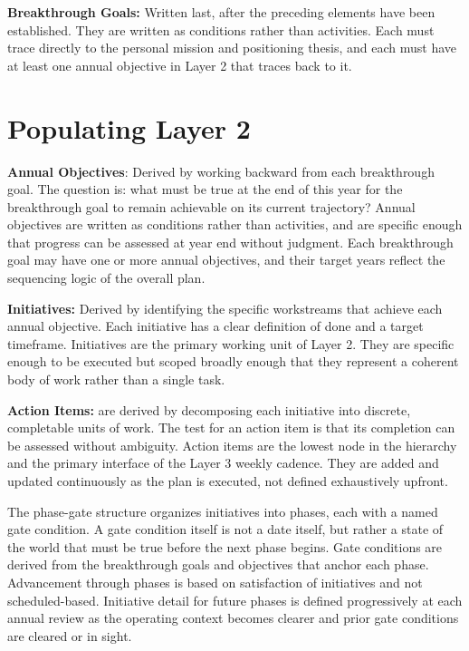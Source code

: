 \documentclass{article}
\begin{document}
\textbf{Breakthrough Goals:} Written last, after the preceding elements have been established. They are written as conditions rather
than activities. Each must trace directly to the personal mission and positioning thesis, and each must have at least one annual 
objective in Layer 2 that traces back to it.

\newpage

\section{Populating Layer 2}

\textbf{Annual Objectives}: Derived by working backward from each breakthrough goal. The question is: what must be true at the end of this 
year for the breakthrough goal to remain achievable on its current trajectory? Annual objectives are written as conditions rather than 
activities, and are specific enough that progress can be assessed at year end without judgment. Each breakthrough goal may have one 
or more annual objectives, and their target years reflect the sequencing logic of the overall plan.

\textbf{Initiatives:} Derived by identifying the specific workstreams that achieve each annual objective. Each initiative has a clear 
definition of done and a target timeframe. Initiatives are the primary working unit of Layer 2. They are specific enough to be executed 
but scoped broadly enough that they represent a coherent body of work rather than a single task.

\textbf{Action Items:} are derived by decomposing each initiative into discrete, completable units of work. The test for an action item is that 
its completion can be assessed without ambiguity. Action items are the lowest node in the hierarchy and the primary interface of the
Layer 3 weekly cadence. They are added and updated continuously as the plan is executed, not defined exhaustively upfront.

The phase-gate structure organizes initiatives into phases, each with a named gate condition. A gate condition itself is not a date itself,
but rather a state of the world that must be true before the next phase begins. Gate conditions are derived from the breakthrough goals and 
objectives that anchor each phase. Advancement through phases is based on satisfaction of initiatives and not scheduled-based. Initiative 
detail for future phases is defined progressively at each annual review as the operating context becomes clearer and prior gate conditions are 
cleared or in sight.
\end{document}
